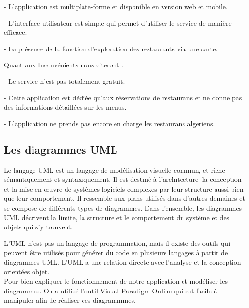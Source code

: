	\tab- L'application est multiplate-forme et disponible en version web et mobile. \medskip

	\tab- L'interface utilisateur est simple qui permet d'utiliser le service de manière efficace. \medskip

	\tab- La présence de la fonction d'exploration des restaurants via une carte.\bigskip

Quant aux Inconvénients nous citeront :\bigskip

	\tab- Le service n'est pas totalement gratuit.\medskip

	\tab- Cette application est dédiée qu'aux réservations de restaurans et ne donne pas des informations détaillées sur les menus.\medskip

	\tab- L'application ne prends pas encore en charge les restaurans algeriens. \medskip

   



\subsection{Les diagrammes UML}
Le langage UML est un langage de modélisation visuelle commun,
et riche sémantiquement et syntaxiquement. Il est destiné à 
l'architecture, la conception et la mise en œuvre de systèmes logiciels complexes par leur structure aussi bien que leur comportement.
Il ressemble aux plans utilisés dans d'autres domaines et se 
compose de différents types de diagrammes. Dans l'ensemble, 
les diagrammes UML décrivent la limite, la structure et le 
comportement du système et des objets qui s'y trouvent.

L'UML n'est pas un langage de programmation, mais il existe des outils qui peuvent être utilisés pour générer du code en plusieurs langages à partir de diagrammes UML. L'UML a une relation directe avec l'analyse et la conception orientées objet.\\
Pour bien expliquer le fonctionnement de notre application et modéliser les diagrammes. On a utilisé l'outil Visual Paradigm Online qui est facile à manipuler afin de réaliser ces diagrammmes.
\newpage
